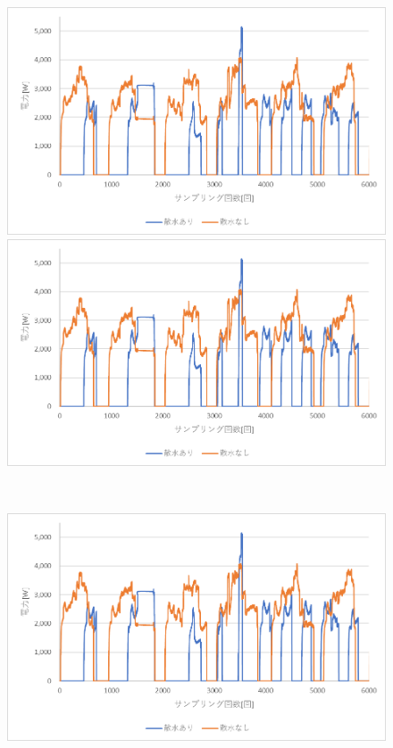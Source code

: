 \documentclass[a4j,fleqn,dvipdfmx,uplatex]{jsarticle}
\begin{document}
\begin{figure}[htb]
  \centering
    \begin{minipage}[b]{0.46\linewidth}
      \centering
      \includegraphics[width=\linewidth]{img/ex1.png}
    \end{minipage}
    \begin{minipage}[b]{0.46\linewidth}
      \centering
      \includegraphics[width=\linewidth]{img/ex1.png}
    \end{minipage}\\
    \begin{minipage}[b]{0.46\linewidth}
      \centering
      \includegraphics[width=\linewidth]{img/ex1.png}

\end{minipage}
\end{figure}
\end{document}
